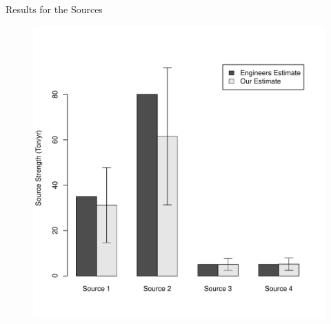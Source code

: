\documentclass[11pt]{beamer}
\theoremstyle{plain}
\theoremstyle{definition}
\begin{document}
\begin{frame}{Results for the Sources}
\begin{figure}
\includegraphics[scale=0.4]{../FigChap4/qUncertainty}
\end{figure}
\end{frame}
\end{document}
